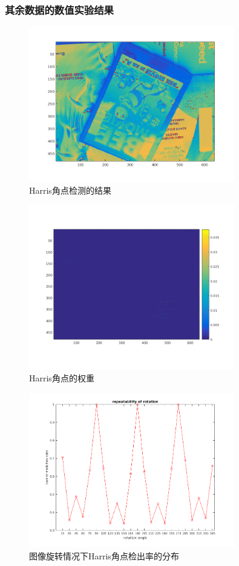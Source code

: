 \documentclass[a4paper, UTF8]{ctexrep}
\begin{document}
			\subsubsection{其余数据的数值实验结果}
				\begin{figure}[htbp!]
					\centering
					\includegraphics[width=0.8\textwidth]{hw1_fig5.png}
					\caption{Harris角点检测的结果}
				\end{figure}
				\clearpage
				\begin{figure}[htbp!]
					\centering
					\includegraphics[width=0.8\textwidth]{hw1_fig6.png}
					\caption{Harris角点的权重}
				\end{figure}
				\clearpage
				\begin{figure}[htbp!]
					\centering
					\includegraphics[width=0.8\textwidth]{hw1_fig7.png}
					\caption{图像旋转情况下Harris角点检出率的分布}
				\end{figure}
\end{document}

